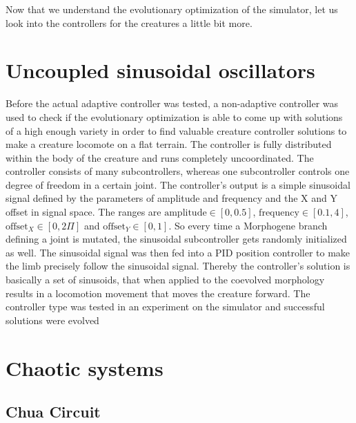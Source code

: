 \documentclass[main]{subfiles}
\begin{document}
Now that we understand the evolutionary optimization of the simulator, let us look into the controllers for the creatures a little bit more. 

\section{Uncoupled sinusoidal oscillators}

Before the actual adaptive controller was tested, a non-adaptive controller was used to check if the evolutionary optimization is able to come up with solutions of a high enough variety in order to find valuable creature controller solutions to make a creature locomote on a flat terrain. The controller is fully distributed within the body of the creature and runs completely uncoordinated. The controller consists of many subcontrollers, whereas one subcontroller controls one degree of freedom in a certain joint. The controller's output is a simple sinusoidal signal defined by the parameters of amplitude and frequency and the X and Y offset in signal space. The ranges are $\text{amplitude} \in [0,0.5]$, $\text{frequency} \in [0.1,4]$, $\text{offset}_X \in [0,2\Pi]$ and $\text{offset}_Y \in [0,1]$. So every time a Morphogene branch defining a joint is mutated, the sinusoidal subcontroller gets randomly initialized as well. The sinusoidal signal was then fed into a PID position controller to make the limb precisely follow the sinusoidal signal. Thereby the controller's solution is basically a set of sinusoids, that when applied to the coevolved morphology results in a locomotion movement that moves the creature forward. The controller type was tested in an experiment on the simulator and successful solutions were evolved

\section{Chaotic systems}

\lipsum[2]

\subsection{Chua Circuit}
\end{document}
